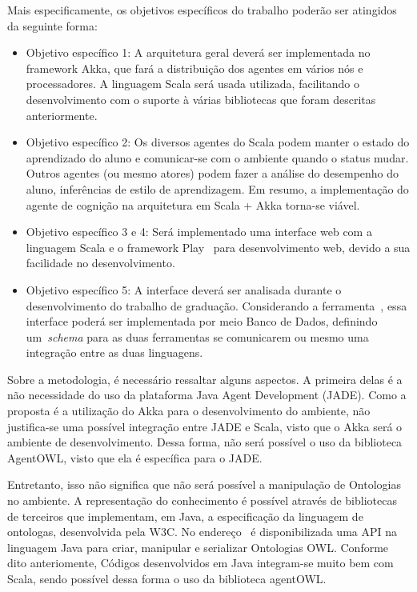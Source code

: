 Mais especificamente, os objetivos específicos do trabalho poderão ser atingidos da seguinte forma:
 \begin{itemize}
	\item Objetivo específico 1: A arquitetura geral deverá ser implementada no framework Akka, que fará a distribuição dos agentes em vários nós e processadores. A linguagem Scala será usada utilizada, facilitando o desenvolvimento com o suporte à várias bibliotecas que foram descritas anteriormente.
	\item Objetivo específico 2: Os diversos agentes do Scala podem manter o estado do aprendizado do aluno e comunicar-se com o ambiente quando o status mudar. Outros agentes (ou mesmo atores) podem fazer a análise do desempenho do aluno, inferências de estilo de aprendizagem. Em resumo, a implementação do agente de cognição na arquitetura em Scala + Akka torna-se viável.
	\item Objetivo específico 3 e 4: Será implementado uma interface web com a linguagem Scala e o framework Play~\cite{Play} para desenvolvimento web, devido a sua facilidade no desenvolvimento.
	\item Objetivo específico 5: A interface deverá ser analisada durante o desenvolvimento do trabalho de graduação. Considerando a ferramenta~\cite{quizWiki}, essa interface poderá ser implementada por meio Banco de Dados, definindo um~\emph{schema} para as duas ferramentas se comunicarem ou mesmo uma integração entre as duas linguagens.
\end{itemize}

Sobre a metodologia, é necessário ressaltar alguns aspectos. A primeira delas é a não necessidade do uso da plataforma Java Agent Development (JADE). Como a proposta é a utilização do Akka para o desenvolvimento do ambiente, não justifica-se uma possível integração entre JADE e Scala, visto que o Akka será o ambiente de desenvolvimento. Dessa forma, não será possível o uso da biblioteca AgentOWL, visto que ela é específica para o JADE.

Entretanto, isso não significa que não será possível a manipulação de Ontologias no ambiente. A representação do conhecimento é possível através de bibliotecas de terceiros que implementam, em Java, a especificação da linguagem de ontologas, desenvolvida pela W3C. No endereço~\cite{http://owlapi.sourceforge.net/} é disponibilizada uma API na linguagem Java para criar, manipular e serializar Ontologias OWL. Conforme dito anteriomente, Códigos desenvolvidos em Java integram-se muito bem com Scala, sendo possível dessa forma o uso da biblioteca agentOWL.

